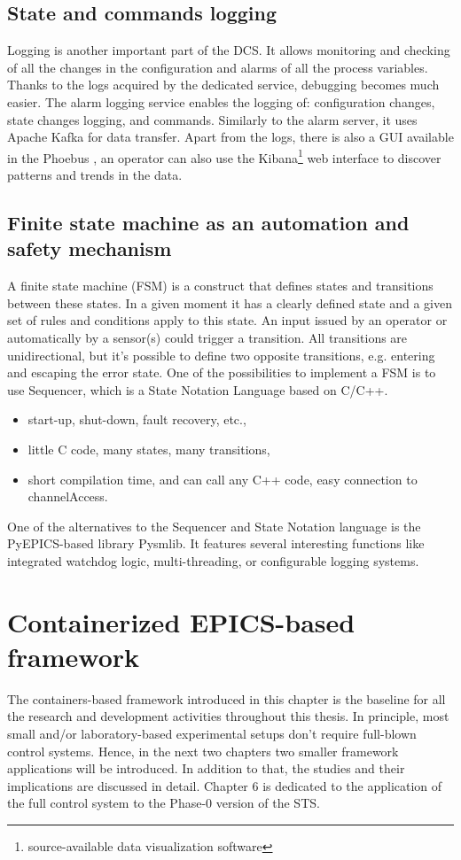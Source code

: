\subsection{State and commands logging}
Logging is another important part of the \gls{DCS}. It allows monitoring and checking of all the changes in the configuration and alarms of all the process variables. Thanks to the logs acquired by the dedicated service, debugging becomes much easier. The alarm logging service enables the logging of: configuration changes, state changes logging, and commands. Similarly to the alarm server, it uses Apache Kafka for data transfer. Apart from the logs, there is also a \gls{GUI} available in the Phoebus \cite{alarm_logger}, an operator can also use the Kibana\footnote{source-available data visualization software} web interface to discover patterns and trends in the data. 

\subsection{Finite state machine as an automation and safety mechanism}
A finite state machine (\gls{FSM}) is a construct that defines states and transitions between these states. In a given moment it has a clearly defined state and a given set of rules and conditions apply to this state. An input issued by an operator or automatically by a sensor(s) could trigger a transition. All transitions are unidirectional, but it's possible to define two opposite transitions, e.g. entering and escaping the error state. 
\newpage
One of the possibilities to implement a \gls{FSM} is to use Sequencer, which is a State Notation Language based on C/C++. 
\begin{itemize}
    \item start-up, shut-down, fault recovery, etc.,
    \item little C code, many states, many transitions,
    \item short compilation time, and can call any C++ code, easy connection to channelAccess.
\end{itemize}

One of the alternatives to the Sequencer and State Notation language is the PyEPICS-based library Pysmlib. It features several interesting functions like integrated watchdog logic, multi-threading, or configurable logging systems.


\section{Containerized EPICS-based framework}

The containers-based framework introduced in this chapter is the baseline for all the research and development activities throughout this thesis. In principle, most small and/or laboratory-based experimental setups don't require full-blown control systems. Hence, in the next two chapters two smaller framework applications will be introduced. In addition to that, the studies and their implications are discussed in detail. Chapter 6 is dedicated to the application of the full control system to the Phase-0 version of the \gls{STS}.